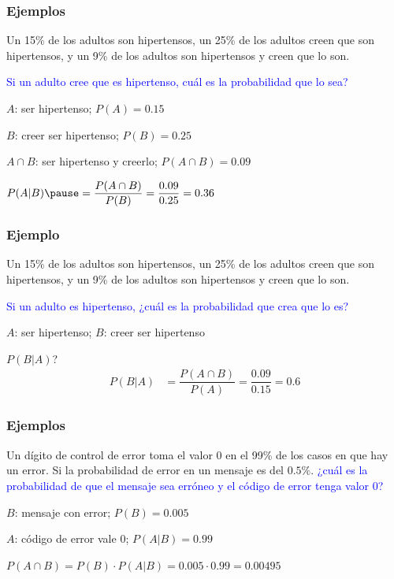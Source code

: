 \documentclass[handout]{beamer}\usepackage[]{graphicx}\usepackage[]{color}
\newcommand{\blue}[1]{\textcolor{blue}{#1}}
\theoremstyle{plain}
\theoremstyle{definition}
\begin{document}
\begin{frame}
\frametitle{Ejemplos}

Un 15\% de los adultos son hipertensos, un 25\% de los adultos creen que son hipertensos, y un 9\% de los adultos son hipertensos y creen que lo son.
\medskip

\blue{Si un adulto cree que es hipertenso, cuál es la probabilidad que lo sea?}
\medskip

$A$: ser hipertenso; $P(A)=0.15$ 
\smallskip

$B$: creer ser hipertenso; $P(B)=0.25$
\smallskip

$A\cap B$: ser hipertenso y creerlo; $P(A\cap B)=0.09$
\bigskip

$P(A|B)\pause=\dfrac{P(A\cap B)}{P(B)}=\dfrac{0.09}{0.25}=0.36$
\end{frame}


\begin{frame}
\frametitle{Ejemplo}

Un 15\% de los adultos son hipertensos, un 25\% de los adultos creen que son hipertensos, y un 9\% de los adultos son hipertensos y creen que lo son.
\medskip


\blue{Si un adulto es hipertenso, ¿cuál es la probabilidad que crea que lo es?}
\medskip

$A$: ser hipertenso; 
$B$: creer ser hipertenso\medskip

$P(B|A)$?\pause
$$
\begin{array}{rl}
P(B|A) & =\dfrac{P(A\cap B)}{P(A)}=\dfrac{0.09}{0.15}=
0.6
\end{array}
$$
\end{frame}



\begin{frame}
\frametitle{Ejemplos}
Un dígito de control de error toma  el valor 0  en el 99\% de los casos en que hay un error. Si la probabilidad de error en un mensaje es  del $0.5\%$. \blue{¿cuál  es la probabilidad de que el mensaje sea erróneo y el código de error tenga valor 0?}
\vspace*{1cm}
\bigskip

$B$: mensaje con error; $P(B)=0.005$
\medskip

$A$: código de error vale 0;
$P(A|B)=0.99$
\bigskip

{$P(A\cap B)=P(B)\cdot P(A|B)=0.005\cdot 0.99=0.00495$}

\end{frame}
\end{document}
